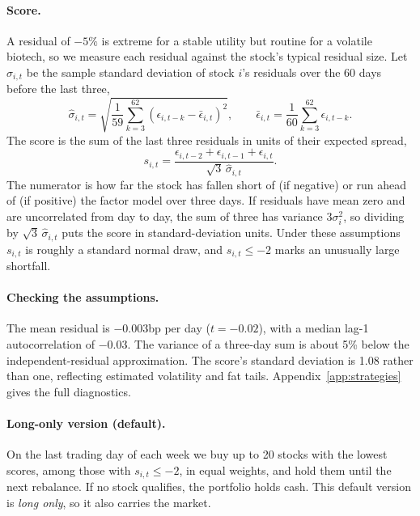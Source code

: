 \documentclass[11pt,letterpaper]{article}
\begin{document}
\paragraph{Score.} A residual of $-5\%$ is extreme for a stable utility but routine for a
volatile biotech, so we measure each residual against the stock's typical residual size. Let
$\hat\sigma_{i,t}$ be the sample standard deviation of stock $i$'s residuals over the 60
days before the last three,
\[
    \hat\sigma_{i,t} = \sqrt{\frac{1}{59} \sum_{k=3}^{62} \left(\epsilon_{i,t-k} - \bar\epsilon_{i,t}\right)^2},
    \qquad
    \bar\epsilon_{i,t} = \frac{1}{60} \sum_{k=3}^{62} \epsilon_{i,t-k} .
\]
The score is the sum of the last three residuals in units of their expected spread,
\[
    s_{i,t} = \frac{\epsilon_{i,t-2} + \epsilon_{i,t-1} + \epsilon_{i,t}}{\sqrt{3}\, \hat\sigma_{i,t}} .
\]
The numerator is how far the stock has fallen short of (if negative) or run ahead of (if
positive) the factor model over three days. If residuals have mean zero and are uncorrelated
from day to day, the sum of three has variance $3\sigma_i^2$, so dividing by
$\sqrt{3}\,\hat\sigma_{i,t}$ puts the score in standard-deviation units. Under these
assumptions $s_{i,t}$ is roughly a standard normal draw, and $s_{i,t} \le -2$ marks an
unusually large shortfall.

\paragraph{Checking the assumptions.} The mean residual is $-0.003$bp per day ($t=-0.02$),
with a median lag-1 autocorrelation of $-0.03$. The variance of a three-day sum is about 5\%
below the independent-residual approximation. The score's standard deviation is 1.08 rather
than one, reflecting estimated volatility and fat tails. Appendix~\ref{app:strategies} gives
the full diagnostics.

\paragraph{Long-only version (default).} On the last trading day of each week we buy up to
20 stocks with the lowest scores, among those with $s_{i,t} \le -2$, in equal weights, and
hold them until the next rebalance. If no stock qualifies, the portfolio holds cash. This
default version is \emph{long only}, so it also carries the market.
\end{document}

